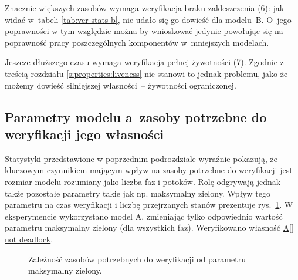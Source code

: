 \documentclass{pracamgr}
\newcommand{\imgr}[1]{rys.~\ref{#1}}
\newcommand{\ttt}[1]{\url{#1}}
\theoremstyle{plain}
\begin{document}
Znacznie większych zasobów wymaga weryfikacja braku zakleszczenia (6):
jak widać w~tabeli \ref{tab:ver-stats-b}, nie udało się go dowieść dla
modelu~B. O~jego poprawności w tym względzie można by wnioskować
jedynie powołując się na poprawność pracy poszczególnych komponentów
w~mniejszych modelach.

Jeszcze dłuższego czasu wymaga weryfikacja pełnej żywotności
(7). Zgodnie z treścią rozdziału \ref{s:properties:liveness} nie
stanowi to jednak problemu, jako że możemy dowieść silniejszej
własności~-- żywotności ograniczonej.


\subsection{Parametry modelu a~zasoby potrzebne do weryfikacji jego
  własności}
Statystyki przedstawione w poprzednim podrozdziale wyraźnie pokazują,
że kluczowym czynnikiem mającym wpływ na zasoby potrzebne do
weryfikacji jest rozmiar modelu rozumiany jako liczba faz i
potoków. Rolę odgrywają jednak także pozostałe parametry takie jak
np. maksymalny zielony.  Wpływ tego parametru na czas weryfikacji i
liczbę przejrzanych stanów prezentuje \imgr{img:max-time-chart}. W
eksperymencie wykorzystano model A, zmieniając tylko odpowiednio
wartość parametru maksymalny zielony (dla wszystkich faz). Weryfikowano
własność \ttt{A[] not deadlock}.
\begin{figure}
  \centering
  \hspace{0.5cm}
  \caption{Zależność zasobów potrzebnych do weryfikacji od parametru maksymalny zielony.}
  \label{img:max-time-chart}
\end{figure}
\end{document}
